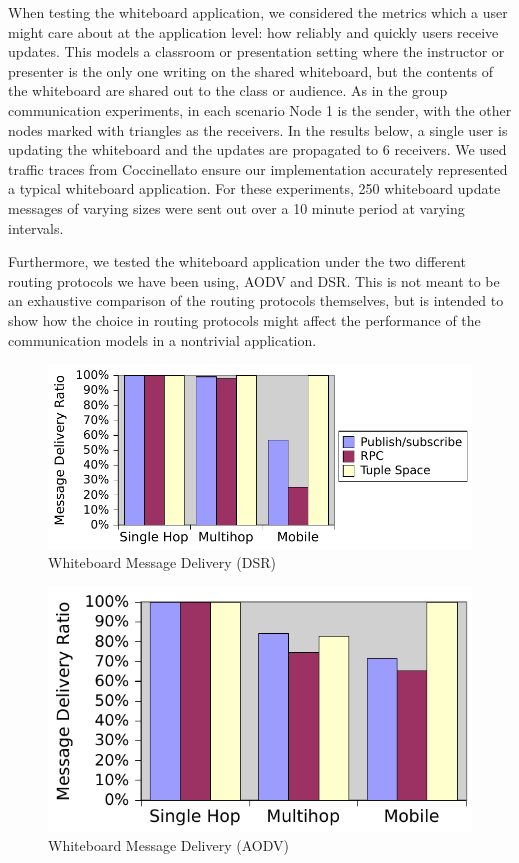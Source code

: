 When testing the whiteboard application, we considered the metrics which a user might care about at the application level: how reliably and quickly users receive updates.
This models a classroom or presentation setting where the instructor or presenter is the only one writing on the shared whiteboard, but the contents of the whiteboard are shared out to the class or audience. As in the group communication experiments, in each scenario Node 1 is the sender, with the other nodes marked with triangles as the receivers.
In the results below, a single user is updating the whiteboard and the updates are propagated to 6 receivers. We used traffic traces from  Coccinella\footnotemark to ensure our implementation accurately represented a typical whiteboard application. For these experiments, 250 whiteboard update messages of varying sizes were sent out over a 10 minute period at varying intervals.


Furthermore, we tested the whiteboard application under the two different routing protocols we have been using, AODV and DSR. This is not meant to be an exhaustive comparison of the routing protocols themselves, but is intended to show how the choice in routing protocols might affect the performance of the communication models in a nontrivial application.

\begin{figure}
\label{fig:wbdeliverydsr}
\includegraphics[width = .9\textwidth, clip, trim = 6px 0px 4px 0px]{figures/wb-dsr-delivery.pdf}
\caption{Whiteboard Message Delivery (DSR)}
\end{figure}	

\begin{figure}
\label{fig:wbdeliveryaodv}
\includegraphics[width = .9\textwidth, clip, trim = 6px 0px 2px 0px]{figures/wb-aodv-delivery.pdf}
\caption{Whiteboard Message Delivery (AODV)}
\end{figure}

